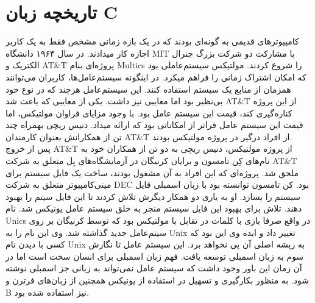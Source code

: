 \section{تاریخچه زبان C}
کامپیوترهای قدیمی به گونه‌ای بودند که در یک بازه زمانی مشخص فقط به یک کاربر اجازه کار میدادند. در سال ۱۹۶۴ دانشگاه MIT با مشارکت دو شرکت بزرگ جنرال الکتریک و AT\&T پروژه‌ای بنام Multics را شروع کردند. مولتیکس سیستم‌عاملی بود که امکان اشتراک زمانی را فراهم میکرد. در اینگونه سیستم‌عامل‌ها، کاربران می‌توانند همزمان از منابع یک سیستم استفاده کنند. این سیستم‌عامل هرچند که در نوع خود بی‌نظیر بود اما معایبی نیز داشت. یکی از معایبی که باعث شد AT\&T از این پروژه کناره‌گیری کند، قیمت این سیستم عامل بود. با وجود مزایای فراوان مولتیکس، اما قیمت این سیستم عامل فراتر از امکاناتی بود که ارائه میداد. دنیس ریچی بهمراه چند تن از همکارانش بعنوان کارمندان AT\&T از افراد درگیر در پروژه مولتیکس بودند.\\پس از خروج AT\&T از پروژه مولتیکس،‌ دنیس ریچی به دو تن از همکاران خود به نام‌های کِن تامسون و برایان کرنیگان در آزمایشگاه‌های بِل متعلق به شرکت AT\&T ملحق شد. پروژه‌ای که این افراد به آن مشغول بودند، ساخت یک فایل سیستم  برای مینی‌کامپیوتر  متعلق به شرکت DEC بود. کن تامسون توانسته بود با زبان اسمبلی فایل سیستم  را بسازد. او به یاری دو همکار دیگرش تلاش کردند تا این فایل سیتم را بهبود دهند. تلاش برای بهبود این فایل سیستم منجر به خلق سیستم عامل یونیکس شد. نام Unics در واقع صرفا بازی با کلمات در تقابل با مولتیکس بود که توسط کرنیگان بر روی سیتم‌عامل جدید گذاشته شد. وی این نام را به Unix تغییر داد و ایده وی این بود که کسی با دیدن نام Unix به ریشه اصلی آن پی نخواهد برد. این سیستم عامل تا نگارش سوم به زبان اسمبلی توسعه یافت. فهم زبان اسمبلی برای انسان سخت است اما در آن زمان این باور وجود داشت که سیستم عامل نمی‌تواند به زبانی جز اسمبلی نوشته شود. به منظور بکارگیری و تسهیل در استفاده از یونیکس همچنین از زبان‌های فرترن و B نیز استفاده شده بود.

